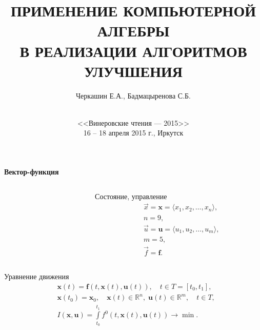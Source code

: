 \documentclass[10pt]{beamer}
\begin{document}
\title[КОМПЬЮТЕРНАЯ АЛГЕБРА В ОПТИМИЗАЦИИ]{ПРИМЕНЕНИЕ КОМПЬЮТЕРНОЙ АЛГЕБРЫ\\
В РЕАЛИЗАЦИИ АЛГОРИТМОВ УЛУЧШЕНИЯ}
\author{Черкашин Е.А., Бадмацыренова С.Б.}
\date[2015]{{}\\[1.5cm]
<<Винеровские чтения --- 2015>>\\
16 -- 18 апреля 2015 г.,
Иркутск
}
\maketitle

\begin{frame}[plain]{\textbf{Вектор-функция} }

  \begin{columns}[t]
    \begin{column}{0.65\textwidth}
      \def\xyz{$x_1,x_2,x_3$} \def\yaw{$x_6$} \def\pitch{$x_5$}
      \def\roll{$x_4$} \def\lift{$x_9$} \def\down{$\quad\! x_7$}
      \def\thrust{$u_1$} \def\rudder{$u_5$} \def\drag{$x_8$}
      \def\flaps{$u_2$} \def\aeleron{$u_3$} \def\engine{}
      \def\elevator{$u_4$} \def\svgwidth{\columnwidth}
      
    \end{column}
    \begin{column}{0.35\textwidth}
      \begin{block}{Состояние, управление}%
        \begin{align*}
          &\vec{x}=\mathbf{x}=\langle x_1,x_2,\ldots,x_n\rangle,\\
          &n=9,\\
          &\vec{u}=\mathbf{u}=\langle u_1,u_2,\ldots,u_m\rangle,\\
          &m=5,\\
          &\vec{f}=\mathbf{f}.
        \end{align*}
      \end{block}
    \end{column}
  \end{columns}
\begin{block}{Уравнение движения}
  \begin{align*}
&\mathbf{x}(t)=\mathbf{f}(t,\mathbf{x}(t),\mathbf{u}(t)),\quad t \in T=[t_0,t_1], \\
&\mathbf{x}(t_0)=\mathbf{x}_0,\quad \mathbf{x}(t)\in \mathbb{R}^n,\; \mathbf{u}(t) \in \mathbb{R}^m,\quad t\in T, \\
&I(\mathbf{x},\mathbf{u})=\int\limits_{t_0}^{t_1}f^0(t,\mathbf{x}(t),\mathbf{u}(t)) \to \min.
  \end{align*}
\end{block}
\end{frame}
\end{document}

